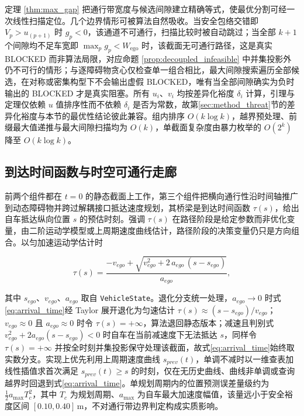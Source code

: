 \documentclass[a4paper,zihao=5]{ctexart}
\theoremstyle{definition}
\begin{document}
定理 \ref{thm:max_gap} 把通行带宽度与候选间隙建立精确等式，使最优分割可经一次线性扫描定位。几个边界情形可被算法自然吸收。当安全包络交错即 $V_p > u_{(p+1)}$ 时 $g_p < 0$，该通道不可通行，扫描比较时被自动跳过；当全部 $k+1$ 个间隙均不足车宽即 $\max_p g_p < W_{\text{ego}}$ 时，该截面无可通行路径，这是真实 BLOCKED 而非算法局限，对应命题 \ref{prop:decoupled_infeasible} 中并集投影外仍不可行的情形；与逐障碍物贪心仅检查单一组合相比，最大间隙搜索遍历全部候选，在对称或密集构型下不会输出虚假 BLOCKED，唯有当全部间隙确实为负时输出的 BLOCKED 才是真实阻塞。所有 $u_i$、$v_i$ 均按差异化裕度 $\delta_i$ 计算，引理与定理仅依赖 $u$ 值排序性而不依赖 $\delta_i$ 是否为常数，故第\ref{sec:method_threat}节的差异化裕度与本节的最优性结论彼此兼容。组内排序 $O(k\log k)$，越界预处理、前缀最大值递推与最大间隙扫描均为 $O(k)$，单截面复杂度由暴力枚举的 $O(2^k)$ 降至 $O(k\log k)$。

\subsection{到达时间函数与时空可通行走廊}
\label{sec:method_corridor}

前两个组件都在 $t=0$ 的静态截面上工作，第三个组件把横向通行性沿时间轴推广到动态障碍物并跨过解耦接口抵达速度规划，其桥梁是到达时间函数 $\tau(s)$，给出自车抵达纵向位置 $s$ 的预估时刻。强调 $\tau(s)$ 在路径阶段是给定参数而非优化变量，由二阶运动学模型或上周期速度曲线估计，路径阶段的决策变量仍只是方向组合。以匀加速运动学估计时

\begin{equation}
    \tau(s) = \frac{-v_{ego} + \sqrt{v_{ego}^{2} + 2\,a_{ego}\,(s - s_{ego})}}{a_{ego}},
    \label{eq:arrival_time}
\end{equation}

其中 $s_{ego}$、$v_{ego}$、$a_{ego}$ 取自 \texttt{VehicleState}。退化分支统一处理，$a_{ego}\to 0$ 时式\eqref{eq:arrival_time}经 Taylor 展开退化为匀速估计 $\tau(s)\approx (s-s_{ego})/v_{ego}$；$v_{ego}\approx 0$ 且 $a_{ego}\approx 0$ 时令 $\tau(s)=+\infty$，算法退回静态版本；减速且判别式 $v_{ego}^{2}+2a_{ego}(s-s_{ego})<0$ 时自车在当前减速度下无法抵达 $s$，同样令 $\tau(s)=+\infty$ 并按全时刻并集投影保守处理该截面，故式\eqref{eq:arrival_time}始终取实数分支。实现上优先利用上周期速度曲线 $s_{prev}(t)$，单调不减时以一维查表加线性插值求首次满足 $s_{prev}(t)\geq s$ 的时刻，仅在无历史曲线、曲线非单调或查询越界时回退到式\eqref{eq:arrival_time}。单规划周期内的位置预测误差量级约为 $\tfrac{1}{2}a_{\max}T_c^{2}$，其中 $T_c$ 为规划周期、$a_{\max}$ 为自车最大加速度幅值，该量远小于安全裕度区间 $[0.10, 0.40]$\,m，不对通行带边界判定构成实质影响。
\end{document}
